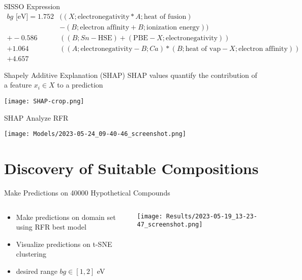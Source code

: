 \documentclass[10pt, aspectratio=169, presentation]{beamer}
\begin{document}
\begin{frame}[label={sec:org39e97fb}]{SISSO Expression}
\begin{align*}
bg\mbox{ [eV]} = 1.752 &((X;\mbox{electronegativity}*A;\mbox{heat of fusion})\\
                       &-(B;\mbox{electron affinity}+B;\mbox{ionization energy}))\\
               +-0.586 &((B;Sn-\mbox{HSE})+(\mbox{PBE}-X;\mbox{electronegativity}))\\
                +1.064 &((A;\mbox{electronegativity}-B;Ca)*(B;\mbox{heat of vap}-X;\mbox{electron affinity}))\\
                +4.657
\end{align*}
\end{frame}

\begin{frame}[label={sec:org8e187cd}]{Shapely Additive Explanation (SHAP)}
SHAP values quantify the contribution of a feature \(x_i \in X\) to a prediction
\autocite{lundberg-2017-unified-approac}

\begin{center}
\texttt{[image: SHAP-crop.png]}
\end{center}
\end{frame}

\begin{frame}[label={sec:orgf5bb645}]{SHAP Analyze RFR}
\begin{center}
\texttt{[image: Models/2023-05-24\_09-40-46\_screenshot.png]}
\end{center}
\end{frame}

\section{Discovery of Suitable Compositions}
\label{sec:org9bc2a69}
\begin{frame}[label={sec:org9d6f221}]{Make Predictions on \alert{40000} Hypothetical Compounds}
\begin{columns}
\begin{column}{0.4\columnwidth}
\begin{itemize}
\item Make predictions on domain set using RFR best model
\item Visualize predictions on t-SNE clustering
\item desired range \(bg \in [1, 2]\) eV
\end{itemize}
\end{column}

\begin{column}{0.6\columnwidth}
\begin{center}
\texttt{[image: Results/2023-05-19\_13-23-47\_screenshot.png]}
\end{center}
\end{column}
\end{columns}
\end{frame}
\end{document}
